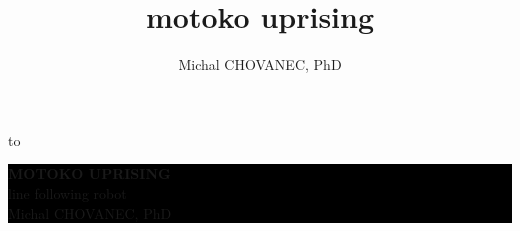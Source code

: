 \documentclass[xcolor=dvipsnames]{beamer}
\title{\color{white} \bf motoko uprising}
\author{\color{white} Michal CHOVANEC, PhD}
\date[EURP]{}
\begin{document}
{
    \usebackgroundtemplate
    {
        \vbox to 
    }
    \begin{frame}



    \centering
     \colorbox{black}
     {
        \begin{minipage}{7cm}
           {\LARGE \color{white} {\bf MOTOKO UPRISING} \\ line following robot} \\
           {\LARGE \color{white} Michal CHOVANEC, PhD} \\
       \end{minipage}
     }


    \end{frame}
}
\end{document}
